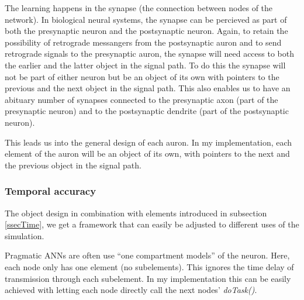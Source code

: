 		The learning happens in the synapse (the connection between nodes of the network). In biological neural systems, the synapse can be percieved as part of both the presynaptic neuron and the postsynaptic neuron.
		Again, to retain the possibility of retrograde messangers from the postsynaptic auron and to send retrograde signals to the presynaptic auron, the synapse will need access to both the earlier and the latter object in the signal path. To do this the synapse will not be part of either neuron but be an object of its own with pointers to the previous and the next object in the signal path. 
		This also enables us to have an abituary number of synapses connected to the presynaptic axon (part of the presynaptic neuron) and to the postsynaptic dendrite (part of the postsynaptic neuron).

		This leads us into the general design of each auron. In my implementation, each element of the auron will be an object of its own, with pointers to the next and the previous object in the signal path.



		
		
		
		


		\subsubsection{Temporal accuracy}
		\label{sssecTemporalAccuracy}
		The object design in combination with elements introduced in subsection \ref{ssecTime}, we get a framework that can easily be adjusted to different uses of the simulation. 
		
		Pragmatic ANNs are often use ``one compartment models'' of the neuron. %
		Here, each node only has one element (no subelements). This ignores the time delay of transmission through each subelement. 
		In my implementation this can be easily achieved with letting each node directly call the next nodes' \emph{\small{doTask()}}. 


